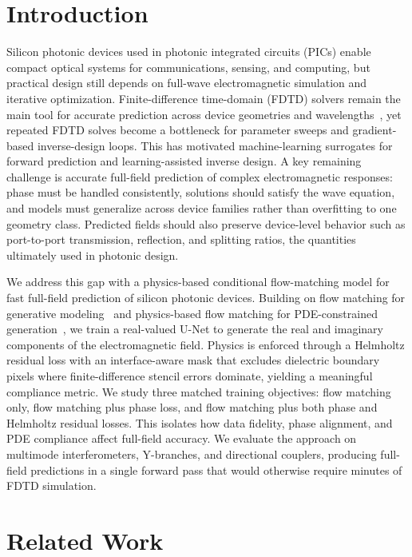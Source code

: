 \documentclass[%
 reprint,
 amsmath,amssymb,
 aps,
floatfix,
]{revtex4-2}
\begin{document}

\section{\label{sec:level1}Introduction}

Silicon photonic devices used in photonic integrated circuits (PICs) enable compact optical systems for communications, sensing, and computing, but practical design still depends on full-wave electromagnetic simulation and iterative optimization. Finite-difference time-domain (FDTD) solvers remain the main tool for accurate prediction across device geometries and wavelengths~\cite{TafloveHagness2005FDTD, Teixeira2023FDTDMethods}, yet repeated FDTD solves become a bottleneck for parameter sweeps and gradient-based inverse-design loops. This has motivated machine-learning surrogates for forward prediction and learning-assisted inverse design. A key remaining challenge is accurate full-field prediction of complex electromagnetic responses: phase must be handled consistently, solutions should satisfy the wave equation, and models must generalize across device families rather than overfitting to one geometry class. Predicted fields should also preserve device-level behavior such as port-to-port transmission, reflection, and splitting ratios, the quantities ultimately used in photonic design.

We address this gap with a physics-based conditional flow-matching model for fast full-field prediction of silicon photonic devices. Building on flow matching for generative modeling~\citep{Lipman2023FlowMatching} and physics-based flow matching for PDE-constrained generation~\citep{Baldan2025PBFM}, we train a real-valued U-Net to generate the real and imaginary components of the electromagnetic field. Physics is enforced through a Helmholtz residual loss with an interface-aware mask that excludes dielectric boundary pixels where finite-difference stencil errors dominate, yielding a meaningful compliance metric. We study three matched training objectives: flow matching only, flow matching plus phase loss, and flow matching plus both phase and Helmholtz residual losses. This isolates how data fidelity, phase alignment, and PDE compliance affect full-field accuracy. We evaluate the approach on multimode interferometers, Y-branches, and directional couplers, producing full-field predictions in a single forward pass that would otherwise require minutes of FDTD simulation.

\section{\label{sec:related}Related Work}
\end{document}
